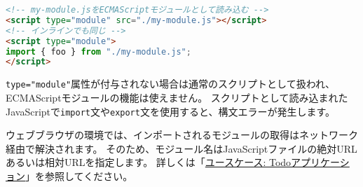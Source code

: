 \begin{lstlisting}[language=HTML]
<!-- my-module.jsをECMAScriptモジュールとして読み込む -->
<script type="module" src="./my-module.js"></script>
<!-- インラインでも同じ -->
<script type="module">
import { foo } from "./my-module.js";
</script>
\end{lstlisting}

\texttt{type="module"}属性が付与されない場合は通常のスクリプトとして扱われ、ECMAScriptモジュールの機能は使えません。
スクリプトとして読み込まれたJavaScriptで\texttt{import}文や\texttt{export}文を使用すると、構文エラーが発生します。

ウェブブラウザの環境では、インポートされるモジュールの取得はネットワーク経由で解決されます。
そのため、モジュール名はJavaScriptファイルの絶対URLあるいは相対URLを指定します。
詳しくは「\hyperlink{todo-app}{ユースケース: Todoアプリケーション}」を参照してください。
